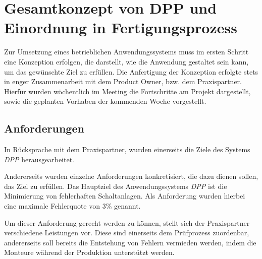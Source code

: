 \documentclass[
    type=Projektarbeit,
    status=draft, %
    language=german, %
    bibengine=bibtex,
]{unibwm-inf-thesis}
\begin{document}
    \chapter{Gesamtkonzept von DPP und Einordnung in Fertigungsprozess}
    Zur Umsetzung eines betrieblichen Anwendungssystems muss im ersten Schritt eine Konzeption erfolgen, die darstellt,
    wie die Anwendung gestaltet sein kann, um das gewünschte Ziel zu erfüllen.
    Die Anfertigung der Konzeption erfolgte stets in enger Zusammenarbeit mit dem Product Owner, bzw. dem Praxispartner.
    Hierfür wurden wöchentlich im Meeting die Fortschritte am Projekt dargestellt, sowie die geplanten Vorhaben der kommenden Woche vorgestellt.

    \section{Anforderungen}
    In Rücksprache mit dem Praxispartner, wurden einerseits die Ziele des Systems \textit{DPP} herausgearbeitet.

    Andererseits wurden einzelne Anforderungen konkretisiert, die dazu dienen sollen, das Ziel zu erfüllen.
    Das Hauptziel des Anwendungssystems \textit{DPP} ist die Minimierung von fehlerhaften Schaltanlagen.
    Als Anforderung wurden hierbei eine maximale Fehlerquote von 3\% genannt.

    Um dieser Anforderung gerecht werden zu können, stellt sich der Praxispartner verschiedene Leistungen vor.
    Diese sind einerseits dem Prüfprozess zuordenbar, andererseits soll bereits die Entstehung von Fehlern vermieden
    werden, indem die Monteure während der Produktion unterstützt werden.
\end{document}
